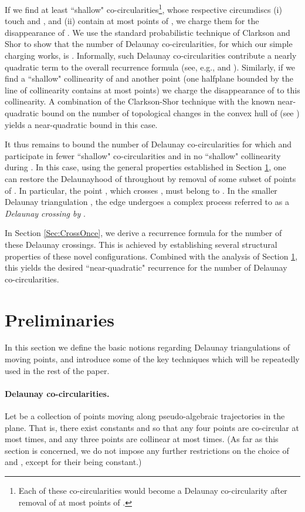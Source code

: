 \documentclass[letter,11pt]{article}
\begin{document}
If we find at least  ``shallow" co-circularities\footnote{Each of these co-circularities would become a Delaunay co-circularity after removal of at most  points of .}, whose respective circumdiscs (i) touch  and , and (ii) contain at most  points of , we charge them for the disappearance of . We use the standard probabilistic technique of Clarkson and Shor \cite{CS} to show that the number of Delaunay co-circularities, for which our simple charging works, is .
Informally, such Delaunay co-circularities contribute a nearly quadratic term to the overall recurrence formula (see, e.g., \cite{ASS} and \cite{ConstantLines}). Similarly, if we find a ``shallow" collinearity of  and another point (one halfplane bounded by the line of collinearity contains at most  points) we charge the disappearance of  to this collinearity. A combination of the Clarkson-Shor technique with the known near-quadratic bound on the number of topological changes in the convex hull of  (see \cite[Section 8.6.1]{SA95}) yields a near-quadratic bound in this case.

It thus remains to bound the number of Delaunay co-circularities for which  and  participate in fewer ``shallow" co-circularities and in no ``shallow" collinearity during . In this case, using the general properties established in Section \ref{Sec:Prelim}, one can restore the Delaunayhood of  throughout  by removal of some subset  of  points of . In particular, the point , which crosses , must belong to .
In the smaller Delaunay triangulation , the edge  undergoes a complex process referred to as a {\it Delaunay crossing by} . 

In Section \ref{Sec:CrossOnce}, we derive a recurrence formula for the number of these Delaunay crossings. 
This is achieved by establishing several structural properties of these novel configurations.
Combined with the analysis of Section \ref{Sec:Prelim}, this yields the desired ``near-quadratic" recurrence for the number of Delaunay co-circularities. 



\section{Preliminaries}\label{Sec:Prelim}
In this section we define the basic notions regarding Delaunay triangulations of moving points, and introduce some of the key techniques which will be repeatedly used in the rest of the paper. 


\paragraph{Delaunay co-circularities.} Let  be a collection of  points moving along pseudo-algebraic trajectories in the plane. That is, there exist constants  and  so that any four points are co-circular at most  times, and any three points are collinear at most  times. (As far as this section is concerned, we do not impose any further restrictions on the choice of  and , except for their being constant.)
\end{document}
